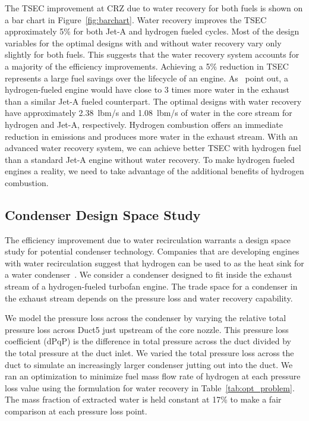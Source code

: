 \documentclass[conf]{new-aiaa}
\begin{document}
The TSEC improvement at CRZ due to water recovery for both fuels is shown on a bar chart in Figure~\ref{fig:barchart}.
Water recovery improves the TSEC approximately 5\% for both Jet-A and hydrogen fueled cycles.
Most of the design variables for the optimal designs with and without water recovery vary only slightly for both fuels.
This suggests that the water recovery system accounts for a majority of the efficiency improvements.
Achieving a 5\% reduction in TSEC represents a large fuel savings over the lifecycle of an engine.
As~\citeauthor{Strom2002} point out, a hydrogen-fueled engine would have close to 3 times more water in the exhaust than a similar Jet-A fueled counterpart.
The optimal designs with water recovery have approximately \SI{2.38}{lbm/s} and \SI{1.08}{lbm/s} of water in the core stream for hydrogen and Jet-A, respectively.
Hydrogen combustion offers an immediate reduction in emissions and produces more water in the exhaust stream.
With an advanced water recovery system, we can achieve better TSEC with hydrogen fuel than a standard Jet-A engine without water recovery.
To make hydrogen fueled engines a reality, we need to take advantage of the additional benefits of hydrogen combustion.
\subsection{Condenser Design Space Study}
\label{sub:dpqp_sweep}

The efficiency improvement due to water recirculation warrants a design space study for potential condenser technology.
Companies that are developing engines with water recirculation suggest that hydrogen can be used to as the heat sink for a water condenser~\cite{arpa-e_2021}.
We consider a condenser designed to fit inside the exhaust stream of a hydrogen-fueled turbofan engine.
The trade space for a condenser in the exhaust stream depends on the pressure loss and water recovery capability.

We model the pressure loss across the condenser by varying the relative total pressure loss across Duct5 just upstream of the core nozzle.
This pressure loss coefficient (dPqP) is the difference in total pressure across the duct divided by the total pressure at the duct inlet.
We varied the total pressure loss across the duct to simulate an increasingly larger condenser jutting out into the duct.
We ran an optimization to minimize fuel mass flow rate of hydrogen at each pressure loss value using the formulation for water recovery in Table~\ref{tab:opt_problem}.
The mass fraction of extracted water is held constant at 17\% to make a fair comparison at each pressure loss point.
\end{document}
